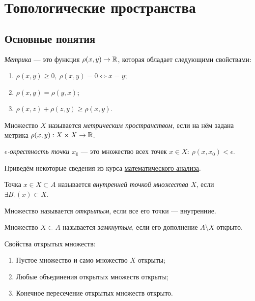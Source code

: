 \section{Топологические пространства}
\subsection{Основные понятия}
\begin{definition}
    \textit{Метрика} — это функция $\rho(x,y) \to \mathbb{R}$, которая обладает следующими свойствами:
    \begin{enumerate}
        \item $\rho(x,y) \geq 0, \ \rho(x,y) = 0 \Longleftrightarrow x = y$;
        \item $\rho(x,y) = \rho(y,x)$;
        \item $\rho(x,z) + \rho(z,y) \geq \rho(x,y)$.
    \end{enumerate}
\end{definition}

\begin{definition}
    Множество $X$ называется \textit{метрическим пространством}, если на нём задана метрика $\rho(x,y): X \times X \to \mathbb{R}$.
\end{definition}

\begin{definition}
    \textit{$\epsilon$-окрестность точки $x_0$} — это множество всех точек $x \in X: \ \rho(x, x_0) < \epsilon$.
\end{definition}

Приведём некоторые сведения из курса \href{https://github.com/yakovlevki/Calculus}{математического анализа}.
\begin{definition}
    Точка $x \in X \subset A$ называется \textit{внутренней точкой множества $X$}, если $\exists B_{\epsilon} (x) \subset X$.
\end{definition}

\begin{definition}
    Множество называется \textit{открытым}, если все его точки — внутренние.
\end{definition}

\begin{definition}
    Множество $X \subset A$ называется \textit{замкнутым}, если его дополнение $A \setminus X$ открыто.
\end{definition}

Свойства открытых множеств:
\begin{enumerate}
    \item Пустое множество и само множество $X$ открыты;
    \item Любые объединения открытых множеств открыты;
    \item Конечное пересечение открытых множеств открыто.
\end{enumerate}

